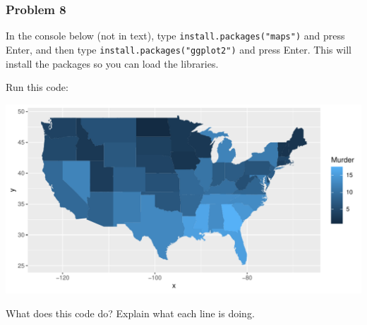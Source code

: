 \documentclass[
]{article}
\newenvironment{Shaded}{\begin{snugshade}}{\end{snugshade}}
\newcommand{\AttributeTok}[1]{\textcolor[rgb]{0.77,0.63,0.00}{#1}}
\newcommand{\CommentTok}[1]{\textcolor[rgb]{0.56,0.35,0.01}{\textit{#1}}}
\newcommand{\FunctionTok}[1]{\textcolor[rgb]{0.00,0.00,0.00}{#1}}
\newcommand{\NormalTok}[1]{#1}
\newcommand{\SpecialCharTok}[1]{\textcolor[rgb]{0.00,0.00,0.00}{#1}}
\newcommand{\StringTok}[1]{\textcolor[rgb]{0.31,0.60,0.02}{#1}}
\begin{document}
\hypertarget{problem-8}{%
\subsubsection{Problem 8}\label{problem-8}}

In the console below (not in text), type
\texttt{install.packages("maps")} and press Enter, and then type
\texttt{install.packages("ggplot2")} and press Enter. This will install
the packages so you can load the libraries.

Run this code:

\begin{Shaded}
\end{Shaded}

\includegraphics{Assignments_files/figure-latex/unnamed-chunk-8-1.pdf}

What does this code do? Explain what each line is doing.
\end{document}
